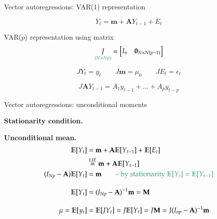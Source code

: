 \documentclass[notes,blackandwhite,mathsans,usenames,dvipsnames]{beamer}
\begin{document}
\begin{frame}{Vector autoregressions: VAR(1) representation}

$$ Y_t = \mathbf{m} + \mathbf{A} Y_{t-1} + E_t $$

 VAR($p$) {\color{mcxs2}representation using matrix}
$$ \underset{\color{mcxs2}(N\times Np)}{J} = \begin{bmatrix} I_n & \mathbf{0}_{N\times N(p-1)} \end{bmatrix} $$

\bigskip$$ JY_t = y_t \qquad J\mathbf{m} = \mu_0 \qquad  JE_t = \epsilon_t $$

$$ J\mathbf{A} Y_{t-1} = A_1 y_{t-1} + \dots + A_p y_{t-p} $$

\end{frame}


\begin{frame}{Vector autoregressions: unconditional moments}

\textbf{Stationarity condition.}


\bigskip\textbf{Unconditional mean.}
\begin{align*}
\mathbb{E}[Y_t] &= \mathbf{m} + \mathbf{A} \mathbb{E}[Y_{t-1}] + \mathbb{E}[E_t]\\
&\overset{LIE}{=} \mathbf{m} + \mathbf{A} \mathbb{E}[Y_{t-1}] \\
(I_{Np} - \mathbf{A})\mathbb{E}[Y_t] &= \mathbf{m} \qquad{\color{mcxs2}\text{-- by stationarity }\mathbb{E}[Y_t] = \mathbb{E}[Y_{t-1}]}\\[2ex]
\mathbb{E}[Y_t] &= (I_{Np} - \mathbf{A})^{-1}\mathbf{m} = \mathbf{M}\\[2ex]
\mu = \mathbb{E}[y_t] &= \mathbb{E}[JY_t]= J\mathbb{E}[Y_t]= J\mathbf{M} = J(I_{np} - \mathbf{A})^{-1}\mathbf{m}
\end{align*}

\end{frame}
\end{document}
